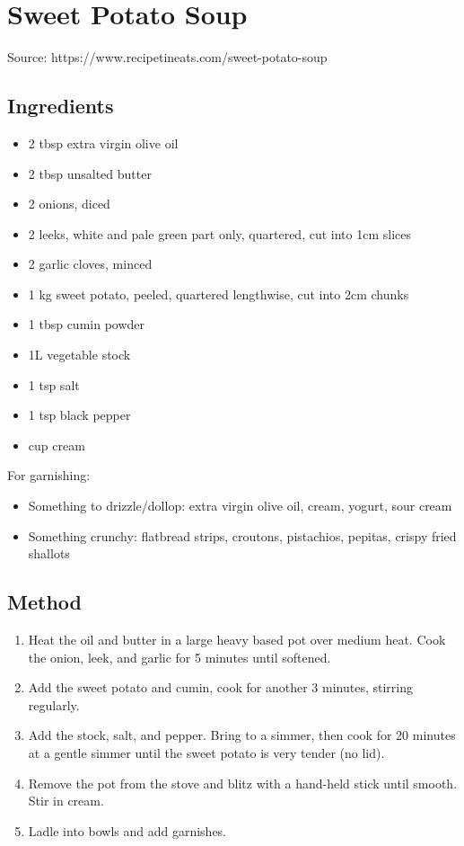\section{Sweet Potato Soup}


Source: https://www.recipetineats.com/sweet-potato-soup

\subsection{Ingredients}

\begin{itemize}
    \item 2 tbsp extra virgin olive oil
    \item 2 tbsp unsalted butter
    \item 2 onions, diced
    \item 2 leeks, white and pale green part only, quartered, cut into 1cm slices
    \item 2 garlic cloves, minced
    \item 1 kg sweet potato, peeled, quartered lengthwise, cut into 2cm chunks
    \item 1 tbsp cumin powder
    \item 1L vegetable stock
    \item 1 tsp salt
    \item 1 tsp black pepper
    \item {} cup cream
\end{itemize}

For garnishing:

\begin{itemize}
    \item Something to drizzle/dollop: extra virgin olive oil, cream, yogurt, sour cream
    \item Something crunchy: flatbread strips, croutons, pistachios, pepitas, crispy fried shallots
\end{itemize}

\subsection{Method}

\begin{enumerate}
    \item Heat the oil and butter in a large heavy based pot over medium heat. Cook the onion, leek, and garlic for 5 minutes until softened.
    \item Add the sweet potato and cumin, cook for another 3 minutes, stirring regularly.
    \item Add the stock, salt, and pepper. Bring to a simmer, then cook for 20 minutes at a gentle simmer until the sweet potato is very tender (no lid).
    \item Remove the pot from the stove and blitz with a hand-held stick until smooth. Stir in cream.
    \item Ladle into bowls and add garnishes.
\end{enumerate}
